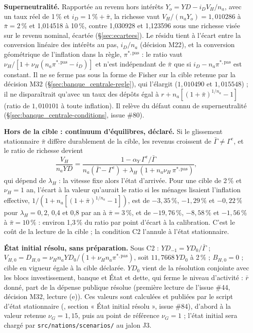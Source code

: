 \documentclass[11pt,a4paper]{article}
\newcommand{\code}[1]{\texttt{\detokenize{#1}}}
\begin{document}
\begin{proposee}
\textbf{Superneutralité.} Rapportée au revenu hors intérêts $Y_o = \mathit{YD} - i_D V_H/n_a$, avec un taux réel de 1\,\% et $i_D = 1\,\% + \bar\pi$, la richesse vaut $V_H/(n_a Y_o) = 1{,}010286$ à $\bar\pi = 2\,\%$ et 1,014518 à 10\,\%, contre 1,030928 et 1,123596 sous une richesse visée sur le revenu nominal, écartée (\S\ref{sec:ecartees}). Le résidu tient à l'écart entre la conversion linéaire des intérêts au pas, $i_D/n_a$ (décision M22), et la conversion géométrique de l'inflation dans la règle, $\pi^{\ast,\mathrm{pas}}$ : le ratio vaut $\nu_H/[1 + \nu_H(n_a\pi^{\ast,\mathrm{pas}} - i_D)]$ et n'est indépendant de $\bar\pi$ que si $i_D - n_a\pi^{\ast,\mathrm{pas}}$ est constant. Il ne se ferme pas sous la forme de Fisher sur la cible retenue par la décision M32 (\S\ref{sec:banque_centrale-regle}), qui l'élargit ($1{,}010490$ et $1{,}015548$) ; il ne disparaîtrait qu'avec un taux des dépôts égal à $r + n_a[(1 + \bar\pi)^{1/n_a} - 1]$ (ratio de $1{,}010101$ à toute inflation). Il relève du défaut connu de superneutralité (\S\ref{sec:banque_centrale-conditions}, issue \#80).

\textbf{Hors de la cible : continuum d'équilibres, déclaré.} Si le glissement stationnaire $\bar\pi$ diffère durablement de la cible, les revenus croissent de $\bar\Gamma \neq \Gamma^e$, et le ratio de richesse devient
\begin{equation*}
\frac{V_H}{n_a \mathit{YD}} = \frac{1 - \alpha_Y\, \Gamma^e/\bar\Gamma}{n_a(\bar\Gamma - \Gamma^e) + \lambda_H\,(1 + n_a \nu_H\, \pi^{\ast,\mathrm{pas}})} ,
\end{equation*}
qui dépend de $\lambda_H$ : la vitesse fixe alors l'état d'arrivée. Pour une cible de 2\,\% et $\nu_H = 1$ an, l'écart à la valeur qu'aurait le ratio si les ménages lisaient l'inflation effective, $1/(1 + n_a[(1 + \bar\pi)^{1/n_a} - 1])$, est de $-3{,}35\,\%$, $-1{,}29\,\%$ et $-0{,}22\,\%$ pour $\lambda_H = 0{,}2$, 0,4 et 0,8 par an à $\bar\pi = 3\,\%$, et de $-19{,}76\,\%$, $-8{,}58\,\%$ et $-1{,}56\,\%$ à $\bar\pi = 10\,\%$ : environ 1,3\,\% du ratio par point d'écart à la calibration. C'est le coût de la lecture de la cible ; la condition C2 l'annule à l'état stationnaire.

\textbf{État initial résolu, sans préparation.} Sous C2 : $\mathit{YD}_{-1} = \mathit{YD}_0/\bar\Gamma$ ; $V_{H,0} = D_{H,0} = \nu_H n_a \mathit{YD}_0/(1 + \nu_H n_a \pi^{\ast,\mathrm{pas}})$, soit $11{,}7668\,\mathit{YD}_0$ à 2\,\% ; $B_{H,0} = 0$ ; cible en vigueur égale à la cible déclarée. $\mathit{YD}_0$ vient de la résolution conjointe avec les blocs investissement, banque et État et dette, qui ferme le niveau d'activité : $\bar r$ donné, part de la dépense publique résolue (première lecture de l'issue \#44, décision M32, lecture (e)). Ces valeurs sont calculées et publiées par le script d'état stationnaire (\code{outils/etat_stationnaire.py}, section « État initial résolu », issue \#84), d'abord à la valeur retenue $\nu_G = 1{,}15$, puis au point de référence $\nu_G = 1$ ; l'état initial sera chargé par \nolinkurl{src/nations/scenarios/} au jalon J3.


\end{proposee}
\end{document}

